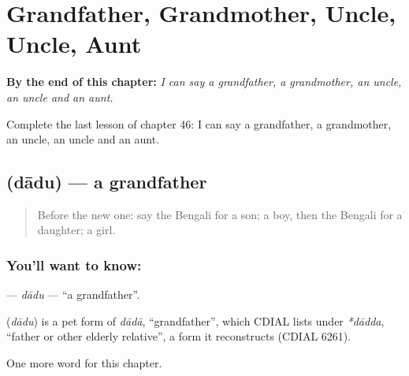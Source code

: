 
\chapter{Grandfather, Grandmother, Uncle, Uncle, Aunt}
\label{ch:bn-grandfather-grandmother-uncle-uncle-aunt}

\begin{chapteropening}
\textbf{By the end of this chapter:} \emph{I can say a grandfather, a grandmother, an uncle, an uncle and an aunt.}

Complete the last lesson of chapter 46: I can say a grandfather, a grandmother, an uncle, an uncle and an aunt.
\end{chapteropening}

\section[\texorpdfstring{\bn{দাদু} (dādu)}{দাদু (dādu)}]{ (dādu) — a grandfather}

\label{lesson:BN-C46-dadu}



\begin{quote}
Before the new one: say the Bengali for a son; a boy, then the Bengali for a daughter; a girl.
\end{quote}

\subsection*{You'll want to know: }
\textbf{} — \emph{dādu} — \textquotedblleft{}a grandfather\textquotedblright{}.

\begin{cousinweb}
\textbf{} (\emph{dādu}) is a pet form of \emph{dādā}, \textquotedblleft{}grandfather\textquotedblright{}, which CDIAL lists under \emph{*dādda}, \textquotedblleft{}father or other elderly relative\textquotedblright{}, a form it reconstructs (CDIAL 6261).
\end{cousinweb}

\begin{grammarlens}[title={What you've built}]
One more word for this chapter.
\end{grammarlens}


